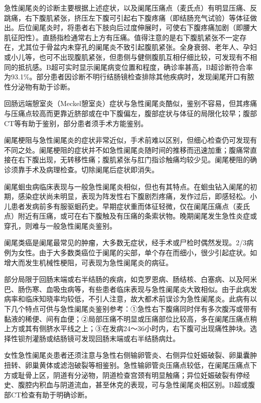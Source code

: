 急性阑尾炎的诊断主要根据上述症状，以及阑尾压痛点（麦氏点）有明显压痛、反跳痛，右下腹肌紧张，挤压左下腹可引起右下腹疼痛（即结肠充气试验）等体征做出。后位阑尾炎时，将患者右下肢向后过度伸展时，可使右下腹疼痛加剧（即腰大肌征阳性）。直肠指检通常右上方有压痛。值得注意的是右下腹肌紧张不一定存在，尤其位于骨盆内未穿孔的阑尾炎不致引起腹肌紧张。全身衰弱、老年人、孕妇或小儿等，也可不出现腹肌紧张，但患侧与健侧腹肌互相仔细比较，可发现有不相同的抵抗感。B超可实时显示阑尾病变位置和程度，确诊率甚高，B超诊断符合率为93.1\%。部分患者因诊断不明行结肠镜检查排除其他疾病时，发现阑尾开口有脓性分泌物有助于诊断。

回肠远端憩室炎（Meckel憩室炎）症状与急性阑尾炎酷似，鉴别不容易，但其疼痛与压痛点较高而更靠近脐部或在中下腹偏左，腹部症状与体征的局限化较早；腹部CT等有助于鉴别，部分患者须手术方能鉴别。

阑尾梗阻与急性阑尾炎的症状非常近似，手术前难以区别，但细心检查仍可发现有不同之处。阑尾梗阻的症状并不如急性阑尾炎随时间的推移而迅速加重；腹痛常直接在右下腹出现，无转移性痛；腹肌紧张与肛门指诊触痛均较少见。阑尾梗阻的确诊须靠手术及病理检查。切除阑尾后症状即消失。

阑尾蛔虫病临床表现与一般急性阑尾炎相似，但也有其特点。在蛔虫钻入阑尾的初期，感染症状尚未明显，表现为阵发性右下腹剧烈疼痛，发作过后，即感轻松。小儿患者发病前多有服驱蛔药史。早期症状重而体征轻微，仅在阑尾压痛点（麦氏点）附近有压痛，或可在右下腹触及有压痛的条索状物。晚期阑尾发生急性炎症或穿孔，则难与一般急性阑尾炎鉴别。

阑尾类癌是阑尾最常见的肿瘤，大多数无症状，经手术或尸检时偶然发现。2/3病例为女性。由于大多数类癌位于阑尾的尖部，单个存在而细小，很少引起症状。如增大而发生机械性梗阻，可表现为急性阑尾炎的病征。

部分局限于回肠末端或右半结肠的疾病，如克罗恩病、肠结核、白塞病、以及阿米巴、肠伤寒、血吸虫病等，有些患者临床表现与急性阑尾炎大致相似。由于此病发病率和临床知晓率均较低，不引人注意，故大都术前误诊为急性阑尾炎。此病有以下几个特点可供与急性阑尾炎鉴别参考：①急性右下腹痛同时伴有多次腹泻或带有黏液的稀便、间有血便；②局部压痛不明显或压痛部位比较高，多在阑尾压痛点稍上方或其有侧脐水平线之上；③在发病24～36小时内，右下腹可出现痛性肿块。选择性钡剂灌肠或结肠镜可发现回肠末端或右半结肠病灶。

女性急性阑尾炎患者还须注意与急性右侧输卵管炎、右侧异位妊娠破裂、卵巢囊肿扭转、卵巢黄体或滤泡破裂等相鉴别。急性输卵管炎压痛点较低，在阑尾压痛点下方或耻骨上区，阴道有分泌物，阴道检查宫颈有明显触痛；异位妊娠破裂有停经史、腹腔内积血与阴道流血，甚至休克的表现，可与急性阑尾炎相区别。B超或腹部CT检查有助于明确诊断。

